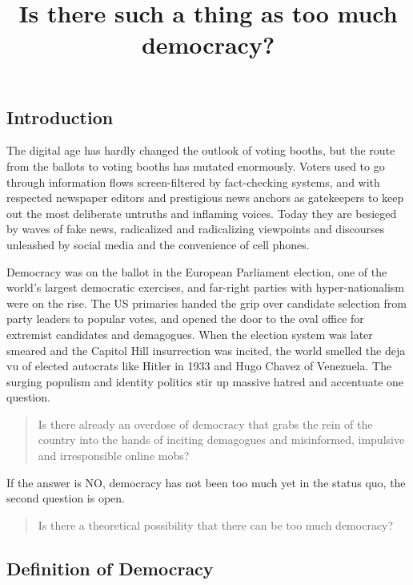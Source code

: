 \documentclass{scrartcl}
\begin{document}
\title{Is there such a thing as too much democracy?}
\maketitle

\subsection*{Introduction}

The digital age has hardly changed the outlook of voting booths, but
the route from the ballots to voting booths has mutated enormously.
Voters used to go through information flows screen-filtered by fact-checking
systems, and with respected newspaper editors and prestigious news
anchors as gatekeepers to keep out the most deliberate untruths and
inflaming voices. Today they are besieged by waves of fake news, radicalized
and radicalizing viewpoints and discourses unleashed by social media
and the convenience of cell phones.

Democracy was on the ballot in the European Parliament election, one of the
world’s largest democratic exercises, and far-right parties with
hyper-nationalism were on the rise. The US primaries handed the grip over
candidate selection from party leaders to popular votes, and opened the door to
the oval office for extremist candidates and demagogues. When the election
system was later smeared and the Capitol Hill insurrection was incited, the
world smelled the deja vu of elected autocrats like Hitler in 1933 and Hugo
Chavez of Venezuela. The surging populism and identity politics stir up massive
hatred and accentuate one question.


\begin{quote}
Is there already an overdose of democracy that grabs the rein of the
country into the hands of inciting demagogues and misinformed, impulsive
and irresponsible online mobs? 
\end{quote}
If the answer is NO, democracy has not been too much yet in the status
quo, the second question is open.
\begin{quote}
Is there a theoretical possibility that there can be too much democracy? 
\end{quote}

\subsection*{Definition of Democracy}
\end{document}
